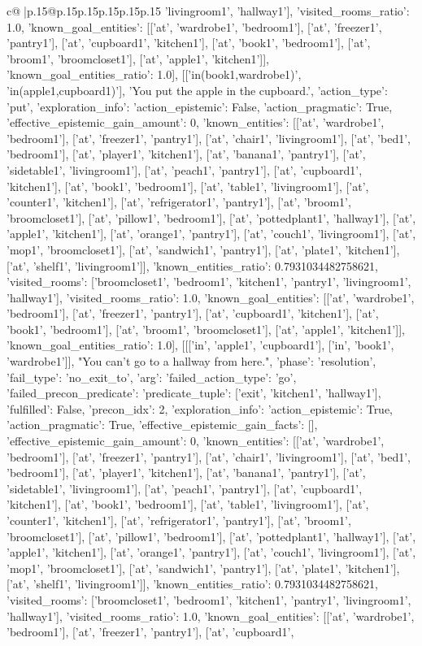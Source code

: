 \documentclass{article}
\begin{document}
{\begin{supertabular}{c@{$\;$}|p{.15\linewidth}@{}p{.15\linewidth}p{.15\linewidth}p{.15\linewidth}p{.15\linewidth}p{.15\linewidth}}
{{{'livingroom1', 'hallway1'], 'visited_rooms_ratio': 1.0, 'known_goal_entities': [['at', 'wardrobe1', 'bedroom1'], ['at', 'freezer1', 'pantry1'], ['at', 'cupboard1', 'kitchen1'], ['at', 'book1', 'bedroom1'], ['at', 'broom1', 'broomcloset1'], ['at', 'apple1', 'kitchen1']], 'known_goal_entities_ratio': 1.0}}], [['in(book1,wardrobe1)', 'in(apple1,cupboard1)'], 'You put the apple in the cupboard.', {'action_type': 'put', 'exploration_info': {'action_epistemic': False, 'action_pragmatic': True, 'effective_epistemic_gain_amount': 0, 'known_entities': [['at', 'wardrobe1', 'bedroom1'], ['at', 'freezer1', 'pantry1'], ['at', 'chair1', 'livingroom1'], ['at', 'bed1', 'bedroom1'], ['at', 'player1', 'kitchen1'], ['at', 'banana1', 'pantry1'], ['at', 'sidetable1', 'livingroom1'], ['at', 'peach1', 'pantry1'], ['at', 'cupboard1', 'kitchen1'], ['at', 'book1', 'bedroom1'], ['at', 'table1', 'livingroom1'], ['at', 'counter1', 'kitchen1'], ['at', 'refrigerator1', 'pantry1'], ['at', 'broom1', 'broomcloset1'], ['at', 'pillow1', 'bedroom1'], ['at', 'pottedplant1', 'hallway1'], ['at', 'apple1', 'kitchen1'], ['at', 'orange1', 'pantry1'], ['at', 'couch1', 'livingroom1'], ['at', 'mop1', 'broomcloset1'], ['at', 'sandwich1', 'pantry1'], ['at', 'plate1', 'kitchen1'], ['at', 'shelf1', 'livingroom1']], 'known_entities_ratio': 0.7931034482758621, 'visited_rooms': ['broomcloset1', 'bedroom1', 'kitchen1', 'pantry1', 'livingroom1', 'hallway1'], 'visited_rooms_ratio': 1.0, 'known_goal_entities': [['at', 'wardrobe1', 'bedroom1'], ['at', 'freezer1', 'pantry1'], ['at', 'cupboard1', 'kitchen1'], ['at', 'book1', 'bedroom1'], ['at', 'broom1', 'broomcloset1'], ['at', 'apple1', 'kitchen1']], 'known_goal_entities_ratio': 1.0}}], [[['in', 'apple1', 'cupboard1'], ['in', 'book1', 'wardrobe1']], "You can't go to a hallway from here.", {'phase': 'resolution', 'fail_type': 'no_exit_to', 'arg': {'failed_action_type': 'go', 'failed_precon_predicate': {'predicate_tuple': ['exit', 'kitchen1', 'hallway1'], 'fulfilled': False, 'precon_idx': 2}}, 'exploration_info': {'action_epistemic': True, 'action_pragmatic': True, 'effective_epistemic_gain_facts': [], 'effective_epistemic_gain_amount': 0, 'known_entities': [['at', 'wardrobe1', 'bedroom1'], ['at', 'freezer1', 'pantry1'], ['at', 'chair1', 'livingroom1'], ['at', 'bed1', 'bedroom1'], ['at', 'player1', 'kitchen1'], ['at', 'banana1', 'pantry1'], ['at', 'sidetable1', 'livingroom1'], ['at', 'peach1', 'pantry1'], ['at', 'cupboard1', 'kitchen1'], ['at', 'book1', 'bedroom1'], ['at', 'table1', 'livingroom1'], ['at', 'counter1', 'kitchen1'], ['at', 'refrigerator1', 'pantry1'], ['at', 'broom1', 'broomcloset1'], ['at', 'pillow1', 'bedroom1'], ['at', 'pottedplant1', 'hallway1'], ['at', 'apple1', 'kitchen1'], ['at', 'orange1', 'pantry1'], ['at', 'couch1', 'livingroom1'], ['at', 'mop1', 'broomcloset1'], ['at', 'sandwich1', 'pantry1'], ['at', 'plate1', 'kitchen1'], ['at', 'shelf1', 'livingroom1']], 'known_entities_ratio': 0.7931034482758621, 'visited_rooms': ['broomcloset1', 'bedroom1', 'kitchen1', 'pantry1', 'livingroom1', 'hallway1'], 'visited_rooms_ratio': 1.0, 'known_goal_entities': [['at', 'wardrobe1', 'bedroom1'], ['at', 'freezer1', 'pantry1'], ['at', 'cupboard1', }}}
\end{supertabular}}
\end{document}
